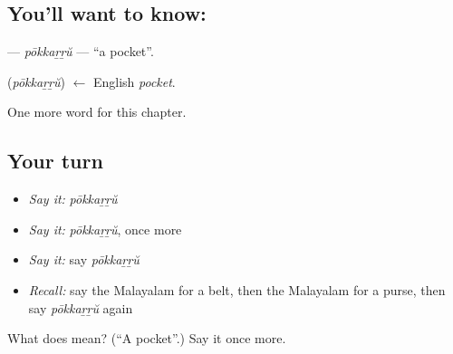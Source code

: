 \subsection*{You'll want to know: }
\textbf{} — \emph{pōkkaṟṟŭ} — \textquotedblleft{}a pocket\textquotedblright{}.

\begin{cousinweb}
\textbf{} (\emph{pōkkaṟṟŭ}) $\leftarrow$ English \emph{pocket}.
\end{cousinweb}

\begin{grammarlens}[title={What you've built}]
One more word for this chapter.
\end{grammarlens}

\subsection*{Your turn}
\begin{itemize}
\raggedright
  \item \emph{Say it:} \emph{pōkkaṟṟŭ}
  \item \emph{Say it:} \emph{pōkkaṟṟŭ}, once more
  \item \emph{Say it:} say \emph{pōkkaṟṟŭ}
  \item \emph{Recall:} say the Malayalam for a belt, then the Malayalam for a purse, then say \emph{pōkkaṟṟŭ} again
\end{itemize}

\begin{tcolorbox}[breakable,colback=teal!4,colframe=teal!35!black,title={Before you move on}]
What does  mean? (\textquotedblleft{}A pocket\textquotedblright{}.) Say it once more.
\end{tcolorbox}
